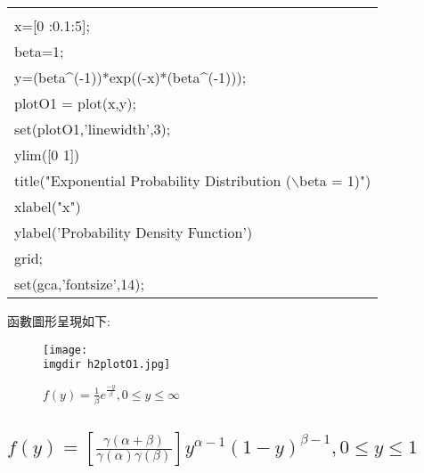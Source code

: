 		\begin{center}\colorbox{slight}{
				\begin{tabular}{p{}}
					\MJHmarker{\textbf{MATLAB語法 :}}\\					
					x=[0 :0.1:5];\\
					beta=1;\\
					y=(beta$\^$(-1))*exp((-x)*(beta$\^$(-1)));\\
					plotO1 = plot(x,y);\\
					set(plotO1,'linewidth',3);\\
					ylim([0 1])\\
					title("Exponential Probability Distribution ($\backslash$beta = 						1)")\\
					xlabel("x")\\
					ylabel('Probability Density Function')\\
					grid;\\
					set(gca,'fontsize',14);\\
				\end{tabular}
			}
			\end{center}
		函數圖形呈現如下:
		\begin{figure}[H]	
		 	 \centering	 			 	 
   			 \texttt{[image: \\imgdir h2plotO1.jpg]} 
   			 \caption{$f(y)=\frac{1}{\beta}e^{\frac{-y}{\beta}},0\leq y \leq \infty$} 	
   			 \label{h2plotO1}   			 		 
		\end{figure}		
		\subsection{$f(y)=\left[ \frac{\gamma (\alpha + \beta)}{\gamma (\alpha)					\gamma (\beta)} \right] y^{\alpha -1}(1-y)^{\beta -1},0 \leq y \leq 1$}%
		
